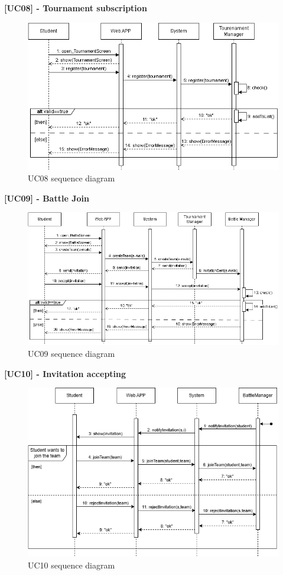 \textbf{[UC08] - Tournament subscription}
\begin{figure}[H]
    \centering
    \includegraphics[width=1\linewidth]{Images/SD_TournamentSubscription.png}
    \caption{UC08 sequence diagram}
    \label{fig:uc08}
\end{figure}

\newpage

\textbf{[UC09] - Battle Join}
\begin{figure}[H]
    \centering
    \includegraphics[width=1\linewidth]{Images/SD_BattleJoin.png}
    \caption{UC09 sequence diagram}
    \label{fig:uc09}
\end{figure}

\textbf{[UC10] - Invitation accepting}
\begin{figure}[H]
    \centering
    \includegraphics[width=1\linewidth]{Images/SD_Invitation.png}
    \caption{UC10 sequence diagram}
    \label{fig:uc10}
\end{figure}

